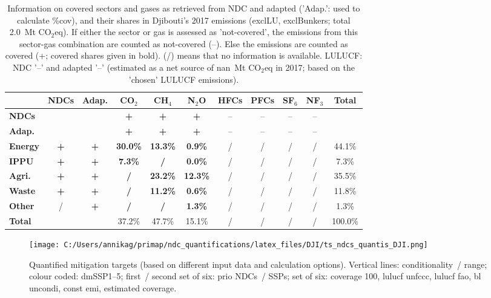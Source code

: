 \documentclass[12pt]{article}
\begin{document}
 \begin{table}[H]\small
 \centering
 \caption{Information on covered sectors and gases as retrieved from NDC and adapted ('Adap.': used to calculate \%cov), and their shares in Djibouti's 2017 emissions (exclLU, exclBunkers; total 2.0~Mt CO$_2$eq).
 If either the sector or gas is assessed as 'not-covered', the emissions from this sector-gas combination are counted as not-covered (--). 
 Else the emissions are counted as covered (+; covered shares given in bold).
 (/) means that no information is available.
 LULUCF: NDC '--' and adapted '--' (estimated as a net source of nan~Mt CO$_2$eq in 2017; based on the 'chosen' LULUCF emissions).}
 \label{tab:coveredSectorsGases}
 \begin{tabular}{l || c c || c c c c c c c | c}
 \bfseries  & \bfseries NDCs & \bfseries Adap. & \bfseries CO$_2$ & \bfseries CH$_4$ & \bfseries N$_2$O & \bfseries HFCs & \bfseries PFCs & \bfseries SF$_6$ & \bfseries NF$_3$ & \bfseries Total \tabularnewline \hline \hline
 \bfseries NDCs &  &  & \bfseries + & \bfseries + & \bfseries + & -- & -- & -- & -- &  \tabularnewline 
 \bfseries Adap. &  &  & \bfseries + & \bfseries + & \bfseries + & -- & -- & -- & -- &  \tabularnewline \hline \hline
 \bfseries Energy & \bfseries + & \bfseries + & \bfseries 30.0\% & \bfseries 13.3\% & \bfseries 0.9\% & / & / & / & / & 44.1\% \tabularnewline 
 \bfseries IPPU & \bfseries + & \bfseries + & \bfseries 7.3\% & \bfseries / & \bfseries 0.0\% & / & / & / & / & 7.3\% \tabularnewline 
 \bfseries Agri. & \bfseries + & \bfseries + & \bfseries / & \bfseries 23.2\% & \bfseries 12.3\% & / & / & / & / & 35.5\% \tabularnewline 
 \bfseries Waste & \bfseries + & \bfseries + & \bfseries / & \bfseries 11.2\% & \bfseries 0.6\% & / & / & / & / & 11.8\% \tabularnewline 
 \bfseries Other & / & \bfseries + & \bfseries / & \bfseries / & \bfseries 1.3\% & / & / & / & / & 1.3\% \tabularnewline \hline
 \bfseries Total &  &  & 37.2\% & 47.7\% & 15.1\% & / & / & / & / & 100.0\% \tabularnewline 
 \end{tabular}
 \end{table}

 \begin{figure}[H]
 \centering
 \texttt{[image: C:/Users/annikag/primap/ndc\_quantifications/latex\_files/DJI/ts\_ndcs\_quantis\_DJI.png]}
 \caption{Quantified mitigation targets (based on different input data and calculation options).
 Vertical lines: conditionality~/ range;
 colour coded: dmSSP1--5;
 first~/ second set of six: prio NDCs~/ SSPs;
 set of six: coverage 100, lulucf unfccc, lulucf fao, bl uncondi, const emi, estimated coverage.}
 \label{fig:miti}
 \end{figure}
\end{document}
